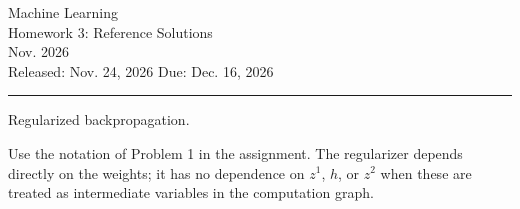 \documentclass[12pt,letterpaper,onecolumn]{exam}
\begin{document}
\thispagestyle{empty}
\begingroup
    \centering
    \LARGE Machine Learning\\
    \LARGE Homework 3: Reference Solutions\\[0.5em]
    \large Nov. 2026\\[0.5em]
    \normalsize Released: Nov. 24, 2026 \qquad Due: Dec. 16, 2026\par
\endgroup
\noindent\rule{\textwidth}{0.4pt}\par
\printanswers
\renewcommand{\solutiontitle}{\noindent\textbf{Ans:}\enspace}

\begin{questions}
    \question Regularized backpropagation.
    \begin{solution}
        Use the notation of Problem 1 in the assignment.
        The regularizer depends directly on the weights; it has no
        dependence on $z^1$, $h$, or $z^2$ when these are treated as
        intermediate variables in the computation graph.
\end{solution}
\end{questions}
\end{document}
